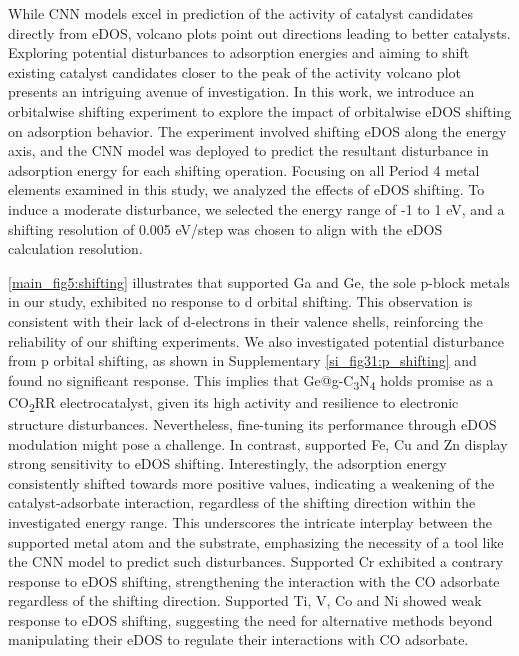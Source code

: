 While CNN models excel in prediction of the activity of catalyst candidates directly from eDOS,
volcano plots point out directions leading to better catalysts.
Exploring potential disturbances to adsorption energies and aiming to shift existing catalyst
candidates closer to the peak of the activity volcano plot presents an intriguing avenue of investigation.
In this work, we introduce an orbitalwise shifting experiment to explore
the impact of orbitalwise eDOS shifting on adsorption behavior.
The experiment involved shifting eDOS along the energy axis,
and the CNN model was deployed to predict the resultant disturbance in adsorption energy for each shifting operation.
Focusing on all Period 4 metal elements examined in this study, we analyzed the effects of eDOS shifting.
To induce a moderate disturbance, we selected the energy range of -1 to 1 eV,
and a shifting resolution of 0.005 eV/step was chosen to align with the eDOS calculation resolution.

\cref{main_fig5:shifting} illustrates that supported Ga and Ge, the sole p-block metals in our study,
exhibited no response to d orbital shifting.
This observation is consistent with their lack of d-electrons in their valence shells,
reinforcing the reliability of our shifting experiments.
We also investigated potential disturbance from p orbital shifting,
as shown in Supplementary \cref{si_fig31:p_shifting} and found no significant response.
This implies that Ge@g-C\textsubscript{3}N\textsubscript{4} holds promise as a CO\textsubscript{2}RR electrocatalyst,
given its high activity and resilience to electronic structure disturbances.
Nevertheless, fine-tuning its performance through eDOS modulation might pose a challenge.
In contrast, supported Fe, Cu and Zn display strong sensitivity to eDOS shifting.
Interestingly, the adsorption energy consistently shifted towards more positive values, indicating a weakening of the catalyst-adsorbate interaction, regardless of the shifting direction within the investigated energy range.
This underscores the intricate interplay between the supported metal atom and the substrate,
emphasizing the necessity of a tool like the CNN model to predict such disturbances.
Supported Cr exhibited a contrary response to eDOS shifting, strengthening the
interaction with the CO adsorbate regardless of the shifting direction.
Supported Ti, V, Co and Ni showed weak response to eDOS shifting,
suggesting the need for alternative methods beyond manipulating their eDOS
to regulate their interactions with CO adsorbate.

